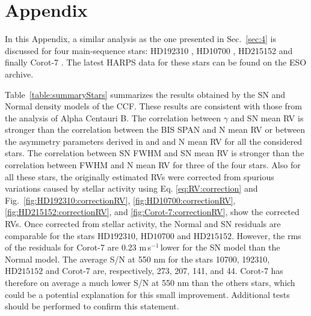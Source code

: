 \documentclass{aa}
\def\ms{\hbox{\,m\,s$^{-1}$}}         %
\newcommand{\xavier}[1]{{\color{blue}[[\textbf{Xavier: }#1]]}}
\begin{document}
\appendix
\section{Appendix} \label{appendix}

In this Appendix, a similar analysis as the one presented in Sec.~\ref{sec:4} is discussed for four main-sequence stars: HD192310 \citep[K2V,][]{Pepe-2011}, HD10700 \citep[G8V,][]{Feng:2017ac}, HD215152 \citep[K3V,][]{Delisle:2018aa} and finally Corot-7 \citep[K0V,][]{Haywood-2014}. The latest HARPS data for these stars can be found on the ESO archive.

Table~\ref{table:summaryStars} summarizes the results obtained by the SN and Normal density models of the CCF. 
These results are consistent with those from the analysis of Alpha Centauri B. 
The correlation between $\gamma$ and SN mean RV is stronger than the correlation between the BIS SPAN and N mean RV or between the asymmetry parameters derived in \citet{Boisse-2009} and \citet{Figueira-2013} and N mean RV for all the considered stars. 
The correlation between SN FWHM and SN mean RV is stronger than the correlation between FWHM and N mean RV for three of the four stars.  
Also for all these stars, the originally estimated RVs were corrected from spurious variations caused by stellar activity using Eq. \ref{eq:RV:correction} and Fig.~\ref{fig:HD192310:correctionRV}, \ref{fig:HD10700:correctionRV}, \ref{fig:HD215152:correctionRV}, and \ref{fig:Corot-7:correctionRV}, show the corrected RVs. 
Once corrected from stellar activity, the Normal and SN residuals are comparable for the stars $\text{HD}192310$, $\text{HD}10700$ and $\text{HD}215152$.
However, the rms of the residuals for Corot-7 are 0.23\,\ms\,lower for the SN model than the Normal model.  %
The average S/N at 550 nm for the stars 10700, 192310, $\text{HD}215152$ and Corot-7 are, respectively, 273, 207, 141, and 44.
Corot-7 has therefore on average a much lower S/N at 550 nm than the others stars, which could be a potential explanation for this small improvement. Additional tests should be performed to confirm this statement. 
\end{document}
